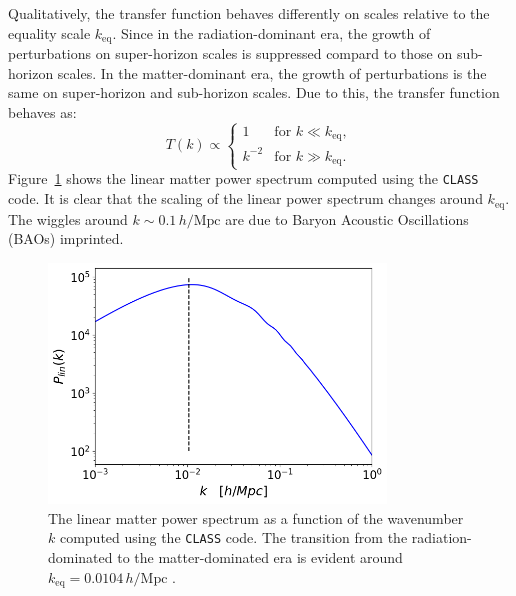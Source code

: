 Qualitatively, the transfer function behaves differently on scales relative to
the equality scale \( k_{\text{eq}} \).
Since in the radiation-dominant era, the growth of perturbations on super-horizon scales is suppressed compard to those on sub-horizon scales. In the matter-dominant era, the growth of perturbations is the same on super-horizon and sub-horizon scales. Due to this, the transfer function behaves as:
\begin{equation}
    T(k) \propto 
    \begin{cases}
        1 & \text{for } k \ll k_{\text{eq}}, \\
        k^{-2} & \text{for } k \gg k_{\text{eq}}.
    \end{cases}
\end{equation}
Figure~\ref{fig:linear_power_spectrum} shows the linear matter power spectrum computed using the \texttt{CLASS} code. It is clear that the scaling of the linear power spectrum changes around $k_{\text{eq}}$. The wiggles around \( k \sim 0.1\, h/\text{Mpc} \) are due to Baryon Acoustic Oscillations (BAOs) imprinted.
\begin{figure}[ht]
    \centering
    \includegraphics[width=0.8\textwidth]{figures/class.png}
    \caption{The linear matter power spectrum as a function of the wavenumber \( k \) computed using the \texttt{CLASS} code. The transition from the radiation-dominated to the matter-dominated era is evident around \( k_{\text{eq}} = 0.0104\, h/\text{Mpc} \) \citep{2020A&A...641A...6P}.
    }
    \label{fig:linear_power_spectrum}
\end{figure}

